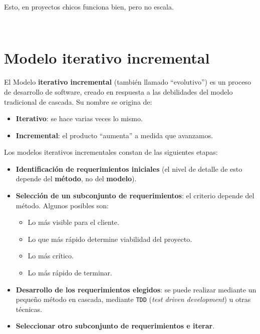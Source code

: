 \documentclass[]{article}
\begin{document}
Esto, en proyectos chicos funciona bien, pero no escala.

~\newline

\section{Modelo iterativo incremental}
El Modelo \textbf{iterativo incremental} (también llamado ``evolutivo'') es un proceso de desarrollo de software, creado en respuesta a las debilidades del modelo tradicional de cascada. Su nombre se origina de:
\begin{itemize}
	\item \textbf{Iterativo}: se hace varias veces lo mismo.
	\item \textbf{Incremental}: el producto ``aumenta'' a medida que avanzamos.
\end{itemize}


Los modelos iterativos incrementales constan de las siguientes etapas:
\begin{itemize}
	\item \textbf{Identificación de requerimientos iniciales} (el nivel de detalle de esto depende del \textbf{método}, no del \textbf{modelo}).
	\item \textbf{Selección de un subconjunto de requerimientos}: el criterio depende del método. Algunos posibles son:
	\begin{itemize}
		\item Lo más visible para el cliente.
		\item Lo que más rápido determine viabilidad del proyecto.
		\item Lo más crítico.
		\item Lo más rápido de terminar.
	\end{itemize}
	\item \textbf{Desarrollo de los requerimientos elegidos}: se puede realizar mediante un pequeño método en cascada, mediante \texttt{TDD} (\emph{test driven development}) u otras técnicas.
	\item \textbf{Seleccionar otro subconjunto de requerimientos e iterar}.
\end{itemize}
\end{document}
